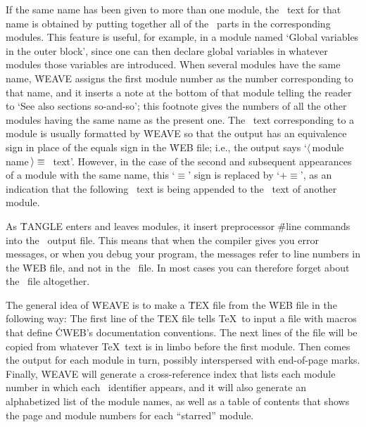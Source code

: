 If the same name has been given to more than one module, the \Cee\ text
for that name is obtained by putting together all of the \Cee\ parts in
the corresponding modules. This feature is useful, for example, in a
module named `Global variables in the outer block', since one can then
declare global variables in whatever modules those variables are
introduced. When several modules have the same name, \.{WEAVE} assigns the
first module number as the number corresponding to that name, and it
inserts a note at the bottom of that module telling the reader to `See
also sections so-and-so'; this footnote gives the numbers of all the other
modules having the same name as the present one. The \Cee\ text
corresponding to a module is usually formatted by \.{WEAVE} so that the
output has an equivalence sign in place of the equals sign in the \.{WEB}
file; i.e., the output says `$\langle\,$module
name$\,\rangle\equiv\null$\Cee\ text'. However, in the case of the second
and subsequent appearances of a module with the same name, this `$\equiv$'
sign is replaced by `$\mathrel+\equiv$', as an indication that the 
following \Cee\ text is being appended to the \Cee\ text of another module.

As \.{TANGLE} enters and leaves modules, it insert preprocessor
\.{\#line} commands into the \Cee\ output file.  This means that
when the compiler gives you error messages, or when you debug your program,
the messages refer to line numbers in the \.{WEB} file, and not in the
\Cee\ file.  In most cases you can therefore
forget about the \Cee\ file altogether.

The general idea of \.{WEAVE} is to make a \.{TEX} file from the \.{WEB}
file in the following way: The first line of the \.{TEX} file
tells \TeX\ to input a file with macros that
define \.{CWEB}'s documentation conventions. The next lines of the file
will be copied from whatever \TeX\ text is in limbo before the first
module.  Then comes the output for each module in turn, possibly
interspersed with end-of-page marks.  Finally, \.{WEAVE} will generate a
cross-reference index that lists each module number in which each \Cee\
identifier appears, and it will also generate an alphabetized list
of the module names, as well as a table of contents that
shows the page and module numbers for each ``starred'' module.

